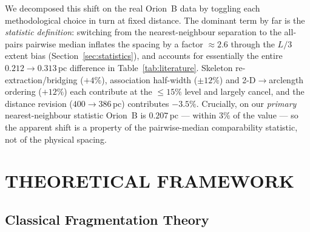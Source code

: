 \documentclass[usenatbib,twoside,twocolumn]{mnras}
\begin{document}
We decomposed this shift on the real Orion~B data by toggling each methodological choice in turn at fixed distance. The dominant term by far is the \emph{statistic definition}: switching from the nearest-neighbour separation to the all-pairs pairwise median inflates the spacing by a factor $\approx2.6$ through the $L/3$ extent bias (Section~\ref{sec:statistics}), and accounts for essentially the entire $0.212\to0.313$\,pc difference in Table~\ref{tab:literature}. Skeleton re-extraction/bridging ($+4\%$), association half-width ($\pm12\%$) and 2-D$\to$arclength ordering ($+12\%$) each contribute at the $\le15\%$ level and largely cancel, and the distance revision ($400\to386$\,pc) contributes $-3.5\%$. Crucially, on our \emph{primary} nearest-neighbour statistic Orion~B is $0.207$\,pc --- within $3\%$ of the \citet{Konyves2020} value --- so the apparent shift is a property of the pairwise-median comparability statistic, not of the physical spacing.

\section{THEORETICAL FRAMEWORK}
\label{sec:theory}

\subsection{Classical Fragmentation Theory}
\end{document}
